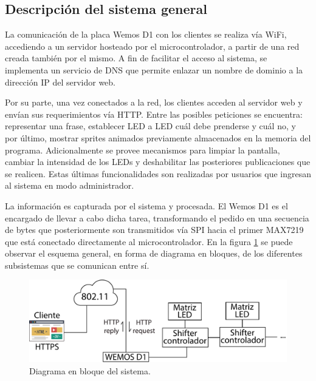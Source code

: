 

    \subsection{Descripción del sistema general}
    La comunicación de la placa Wemos D1 con los clientes se realiza vía WiFi, accediendo a un servidor hosteado por el microcontrolador, a partir de una red creada también por el mismo. A fin de facilitar el acceso al sistema, se implementa un servicio de DNS que permite enlazar un nombre de dominio a la dirección IP del servidor web.

    Por su parte, una vez conectados a la red, los clientes acceden al servidor web y envían sus requerimientos vía HTTP. Entre las posibles peticiones se encuentra: representar una frase, establecer LED a LED cuál debe prenderse y cuál no, y por último, mostrar sprites animados previamente almacenados en la memoria del programa. Adicionalmente se provee mecanismos para limpiar la pantalla, cambiar la intensidad de los LEDs y deshabilitar las posteriores publicaciones que se realicen. Estas últimas funcionalidades son realizadas por usuarios que ingresan al sistema en modo administrador.
    
    La información es capturada por el sistema y procesada. El Wemos D1 es el encargado de llevar a cabo dicha tarea, transformando el pedido en una secuencia de bytes que posteriormente son transmitidos vía SPI hacia el primer MAX7219 que está conectado directamente al microcontrolador. En la figura \ref{fig:diagrama-bloque} se puede observar el esquema general, en forma de diagrama en bloques, de los diferentes subsistemas que se comunican entre sí.

    \begin{figure}[ht!]
        \centering
        \begin{center}
            \includegraphics[width=\textwidth]{imagenes/diagrama-bloques.pdf}
            \caption{Diagrama en bloque del sistema.}
            \label{fig:diagrama-bloque}
        \end{center}
    \end{figure}


